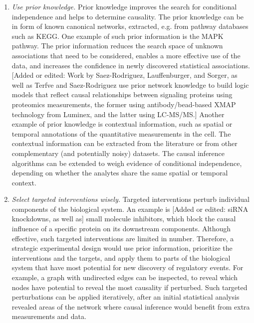 \documentclass[journal=jacsat,manuscript=article]{achemso}
\def\added#1{{\color{magenta}[Added or edited: #1]}}
\begin{document}
\begin{enumerate}
\item \textit{Use prior knowledge.} Prior knowledge improves the search for conditional independence and helps to determine causality. The prior knowledge can be in form of known canonical networks, extracted, e.g. from pathway databases such as KEGG. One example of such prior information is the MAPK pathway. The prior information reduces the search space of unknown associations that need to be considered, enables a more effective use of the data, and increases the confidence in newly discovered statistical associations.  \added{Work by Saez-Rodriguez, Lauffenburger, and Sorger\cite{SaezRodriguez:2009hb}, as well as Terfve and Saez-Rodriguez\cite{Terfve:2015kw} use prior network knowledge to build logic models that reflect causal relationships between signaling proteins using proteomics measurements, the former using antibody/bead-based XMAP technology from Luminex, and the latter using LC-MS/MS.} Another example of prior knowledge is contextual information, such as spatial or temporal annotations of the quantitative measurements in the cell. The contextual information can be extracted from the literature or from other complementary (and potentially noisy) datasets. The causal inference algorithms can be extended to weigh evidence of conditional independence, depending on whether the analytes share the same spatial or temporal context. 

\item \textit{Select targeted interventions wisely.} Targeted interventions perturb individual components of the biological system.  An example is \added{siRNA knockdowns, as well as} small molecule inhibitors, which block the causal influence of a specific protein on its downstream components. Although effective, such targeted interventions are limited in number. Therefore, a strategic experimental design would use prior information, prioritize the interventions and the targets, and apply them to parts of the biological system that have most potential for new discovery of regulatory events.  For example, a graph with undirected edges can be inspected, to reveal which nodes have potential to reveal the most causality if perturbed. Such targeted perturbations can be applied iteratively, after an initial statistical analysis revealed areas of the network where causal inference would benefit from extra measurements and data. 



\end{enumerate}
\end{document}

